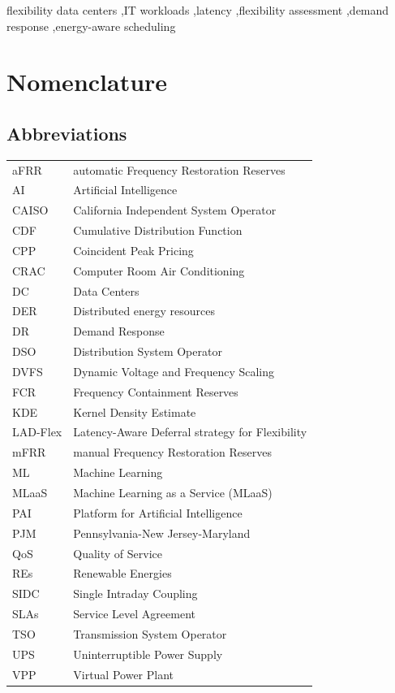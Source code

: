 \documentclass[preprint,12pt]{elsarticle}
\begin{document}
\begin{frontmatter}
\begin{keyword}
flexibility data centers \sep IT workloads \sep latency \sep flexibility assessment \sep demand response \sep energy-aware scheduling
\end{keyword}

\end{frontmatter}


\section*{Nomenclature}

\subsection*{Abbreviations}
\begin{tabular}{ll}
aFRR & automatic Frequency Restoration Reserves \\
AI & Artificial Intelligence\\
CAISO & California Independent System Operator \\
CDF & Cumulative Distribution Function \\
CPP & Coincident Peak Pricing \\
CRAC & Computer Room Air Conditioning \\
DC & Data Centers \\
DER & Distributed energy resources \\
DR & Demand Response \\
DSO & Distribution System Operator \\
DVFS & Dynamic Voltage and Frequency Scaling \\
FCR & Frequency Containment Reserves \\
KDE & Kernel Density Estimate \\
LAD-Flex & Latency-Aware Deferral strategy for Flexibility \\
mFRR & manual Frequency Restoration Reserves \\
ML & Machine Learning \\
MLaaS & Machine Learning as a Service (MLaaS) \\
PAI & Platform for Artificial Intelligence \\
PJM & Pennsylvania-New Jersey-Maryland \\
QoS & Quality of Service \\
REs & Renewable Energies \\
SIDC & Single Intraday Coupling \\
SLAs & Service Level Agreement \\
TSO & Transmission System Operator \\
UPS & Uninterruptible Power Supply \\
VPP & Virtual Power Plant\\  
\end{tabular}
\end{document}

